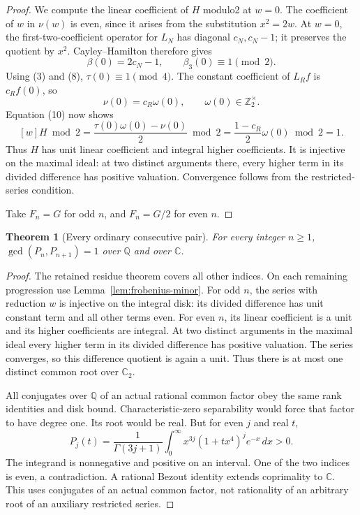 \documentclass[11pt]{article}
\newtheorem{theorem}{Theorem}
\begin{document}
\begin{proof}
We compute the linear coefficient of $H$ modulo2 at $w=0$.
The coefficient of $w$ in $\nu(w)$ is even, since it arises from
the substitution $x^2=2w$. At $w=0$, the first-two-coefficient
operator for $L_N$ has diagonal $c_N,c_N-1$; it preserves
the quotient by $x^2$. Cayley--Hamilton therefore gives
\[
 \beta(0)=2c_N-1,\qquad \beta_3(0)\equiv1\pmod2.
\]
Using (3) and (8), $\tau(0)\equiv1\pmod4$.
The constant coefficient of $L_Rf$ is $c_R f(0)$, so
\[
 \nu(0)=c_R\omega(0),\qquad \omega(0)\in\mathbb Z_2^\times.
\]
Equation (10) now shows
\[
 [w]H\bmod2
   =\frac{\tau(0)\omega(0)-\nu(0)}2\bmod2
   =\frac{1-c_R}{2}\omega(0)\bmod2=1.                \tag{11}
\]
Thus $H$ has unit linear coefficient and integral higher coefficients.
It is injective on the maximal ideal: at two distinct arguments there,
every higher term in its divided difference has positive valuation.
Convergence follows from the restricted-series condition.

Take $F_n=G$ for odd $n$, and $F_n=G/2$ for even $n$.
\end{proof}

\begin{theorem}[Every ordinary consecutive pair]\label{thm:coprime}
For every integer $n\ge1$, $\gcd(P_n,P_{n+1})=1$ over
$\mathbb Q$ and over $\mathbb C$.
\end{theorem}
\begin{proof}
The retained residue theorem covers all other indices.
On each remaining progression use Lemma~\ref{lem:frobenius-minor}.
For odd $n$, the series with reduction $w$ is injective on the
integral disk: its divided difference has unit constant term and
all other terms even.
For even $n$, its linear coefficient is a unit and its higher
coefficients are integral. At two distinct arguments in the
maximal ideal every higher term in its divided difference has
positive valuation. The series converges, so this difference
quotient is again a unit.
Thus there is at most one distinct common root over $\mathbb C_2$.

All conjugates over $\mathbb Q$ of an actual rational common factor
obey the same rank identities and disk bound. Characteristic-zero
separability would force that factor to have degree one.
Its root would be real. But for even $j$ and real $t$,
\[
 P_j(t)=\frac1{\Gamma(3j+1)}
 \int_0^\infty x^{3j}(1+tx^4)^j e^{-x}\,dx>0.
\]
The integrand is nonnegative and positive on an interval.
One of the two indices is even, a contradiction.
A rational Bezout identity extends coprimality to $\mathbb C$.
This uses conjugates of an actual common factor, not rationality
of an arbitrary root of an auxiliary restricted series.
\end{proof}
\end{document}
